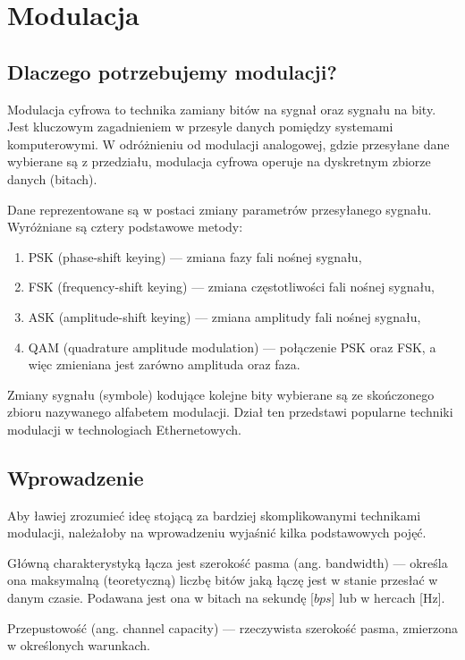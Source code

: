 \section{Modulacja}

\subsection{Dlaczego potrzebujemy modulacji?}

Modulacja cyfrowa to technika zamiany bitów na sygnał oraz sygnału na bity. Jest kluczowym zagadnieniem w przesyle danych pomiędzy systemami komputerowymi. W odróżnieniu od modulacji analogowej, gdzie przesyłane dane wybierane są z przedziału,
modulacja cyfrowa operuje na dyskretnym zbiorze danych (bitach).

Dane reprezentowane są w postaci zmiany parametrów przesyłanego sygnału. Wyróżniane są cztery podstawowe metody:

\begin{enumerate}
    \item PSK (phase-shift keying) --- zmiana fazy fali nośnej sygnału,
    \item FSK (frequency-shift keying) --- zmiana częstotliwości fali nośnej sygnału,
    \item ASK (amplitude-shift keying) --- zmiana amplitudy fali nośnej sygnału,
    \item QAM (quadrature amplitude modulation) --- połączenie PSK oraz FSK, a więc zmieniana jest zarówno amplituda oraz faza.
\end{enumerate}

Zmiany sygnału (symbole) kodujące kolejne bity wybierane są ze skończonego zbioru nazywanego alfabetem modulacji.
Dział ten przedstawi popularne techniki modulacji w technologiach Ethernetowych.

\subsection{Wprowadzenie}

Aby ławiej zrozumieć ideę stojącą za bardziej skomplikowanymi technikami modulacji, należałoby na wprowadzeniu wyjaśnić kilka podstawowych pojęć.

Główną charakterystyką łącza jest szerokość pasma (ang. bandwidth) --- określa ona maksymalną (teoretyczną) liczbę bitów jaką łączę jest w stanie przesłać w danym czasie. Podawana jest ona w bitach na sekundę [$bps$] lub w hercach [Hz].

Przepustowość (ang. channel capacity) --- rzeczywista szerokość pasma, zmierzona w określonych warunkach.

